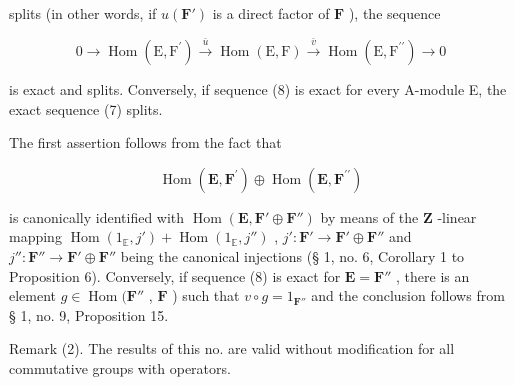splits (in other words, if \(u(\mathbf{F}')\) is a direct factor of \(\mathbf{F}\) ), the sequence

\[
0 \longrightarrow \operatorname{Hom} (\mathrm{E}, \mathrm{F} ^ {\prime}) \stackrel {\bar {u}} {\longrightarrow} \operatorname{Hom} (\mathrm{E}, \mathrm{F}) \stackrel {\bar {v}} {\longrightarrow} \operatorname{Hom} (\mathrm{E}, \mathrm{F} ^ {\prime \prime}) \longrightarrow 0\tag{8}
\]

is exact and splits. Conversely, if sequence (8) is exact for every A-module E, the exact sequence (7) splits.

The first assertion follows from the fact that

\[
\operatorname{Hom} (\mathbf {E}, \mathbf {F} ^ {\prime}) \oplus \operatorname{Hom} (\mathbf {E}, \mathbf {F} ^ {\prime \prime})
\]

is canonically identified with \(\operatorname{Hom}(\mathbf{E}, \mathbf{F}' \oplus \mathbf{F}'')\) by means of the \(\mathbf{Z}\) -linear mapping \(\operatorname{Hom}(1_{\mathbb{E}}, j') + \operatorname{Hom}(1_{\mathbb{E}}, j'')\) , \(j': \mathbf{F}' \to \mathbf{F}' \oplus \mathbf{F}''\) and \(j'': \mathbf{F}'' \to \mathbf{F}' \oplus \mathbf{F}''\) being the canonical injections (§ 1, no. 6, Corollary 1 to Proposition 6). Conversely, if sequence (8) is exact for \(\mathbf{E} = \mathbf{F}''\) , there is an element \(g \in \operatorname{Hom}(\mathbf{F}''\) , \(\mathbf{F}\) ) such that \(v \circ g = 1_{\mathbf{F}''}\) and the conclusion follows from § 1, no. 9, Proposition 15.

Remark (2). The results of this no. are valid without modification for all commutative groups with operators.

